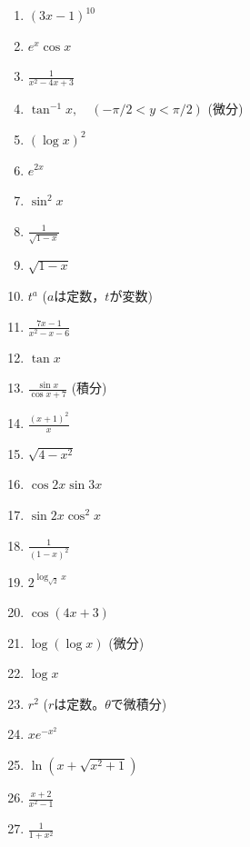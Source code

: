 \documentclass[twocolumn,11pt]{jarticle}
\begin{document}
{\small
\begin{enumerate}
\item \label{itemapp:(3x-1)10}$\displaystyle (3x-1)^{10}$
\item \label{itemapp:e2cosx}$\displaystyle e^x\cos x $
\item $\displaystyle \frac{1}{x^2-4x+3}$
\item \label{ditemapp:tan-1x}$\displaystyle \tan^{-1}x,\quad(-\pi/2<y<\pi/2)$ (微分)
\item \label{itemapp:(logx)2}$\displaystyle (\log x)^2 $
\item $e^{2x}$
\item \label{itemapp:sin2x}$\displaystyle \sin^2 x $
\item \label{itemapp:1/sqrt(1-x)}$\displaystyle \frac{1}{\sqrt{1-x}}$
\item \label{itemapp:sqrt(1-x)}$\displaystyle \sqrt{1-x} $
\item \label{ditemapp:t^a}$t^a$  ($a$は定数，$t$が変数)
\item \label{itemapp:(7x-1)(x^2-x-6)}$\displaystyle \frac{7x-1}{x^2-x-6}$
\item \label{itemapp:tanx}$\displaystyle \tan x$
\item \label{itemapp:sinx/cosx+7}$\displaystyle \frac{\sin x}{\cos x+7}$ (積分)
\item \label{itemapp:(1+x)2/x}$\displaystyle\frac{(x+1)^2}{x}$
\item \label{itemapp:(4-x2)}$\displaystyle \sqrt{4-x^2}$
\item \label{itemapp:cos2xsin3x}$\displaystyle\cos 2x\sin 3x$
\item $\sin 2x\cos^2 x$
\item \label{itemapp:1/(1-x)2}$\displaystyle \frac{1}{(1-x)^2}$
\item $2^{\log_{\sqrt{2}}x}$
\item \label{itemapp:cos(4x+3)}$\displaystyle \cos(4x+3)$
\item \label{ditemapp:loglogx}$\log(\log x)$ (微分)
\item $\log x$
\item $r^2$ ($r$は定数。$\theta$で微積分)
\item \label{ditemapp:xe-x2}$xe^{-x^2}$
\item \label{ditemapp:ln(x+sqrt(x2+1))}$\ln(x+\sqrt{x^2+1})$
\item $\displaystyle\frac{x+2}{x^2-1}$
\item \label{itemapp:1/1+x2}$\displaystyle \frac{1}{1+x^2}$

\end{enumerate}}
\end{document}

